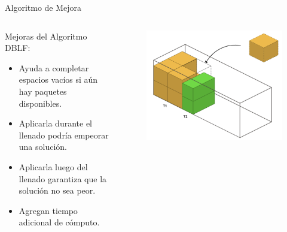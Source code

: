 \documentclass[handout]{beamer}
\begin{document}
\begin{frame}{Algoritmo de Mejora}
    \begin{columns}
        \begin{column}{0.6\textwidth}
            \begin{exampleblock}{Mejoras del Algoritmo DBLF:}
                \begin{itemize}[<+-| alert@+>]
                    \item Ayuda a completar espacios vacíos si aún hay paquetes disponibles.
                    \item Aplicarla durante el llenado podría empeorar una solución.
                    \item Aplicarla luego del llenado garantiza que la solución no sea peor.
                    \item Agregan tiempo adicional de cómputo.
                \end{itemize}
            \end{exampleblock}
        \end{column}
        \begin{column}{0.4\textwidth}
            \begin{figure}
                \centering
                \includegraphics[width=1\textwidth]{pic/dblf-mejora.png}
                \label{fig:dblf-mejora}
            \end{figure}
        \end{column}
    \end{columns}
\end{frame}
\end{document}
